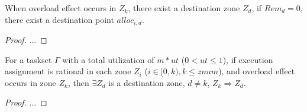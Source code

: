 \documentclass{article}
\begin{document}
\begin{lemm}
	When overload effect occurs in $Z_k$, there exist a destination zone $Z_d$, if $Rem_d=0$, there exist a destination point $alloc_{i,d}$.
\end{lemm}

\begin{proof}
...
\end{proof}

\begin{lemm}
	For a taskset $\Gamma$ with a total utilization of $m*ut$ ($0 < ut \leq 1$), 
	if execution assignment is rational in each zone $Z_i$ ($i \in [0, k), k \leq znum$), 
	and overload effect occurs in zone $Z_k$, 
	then $\exists Z_d$ is a destination zone, $d \ne k$, $Z_k \Rightarrow Z_d$.
\end{lemm}

\begin{proof}
	...
\end{proof}
	
\end{document}

